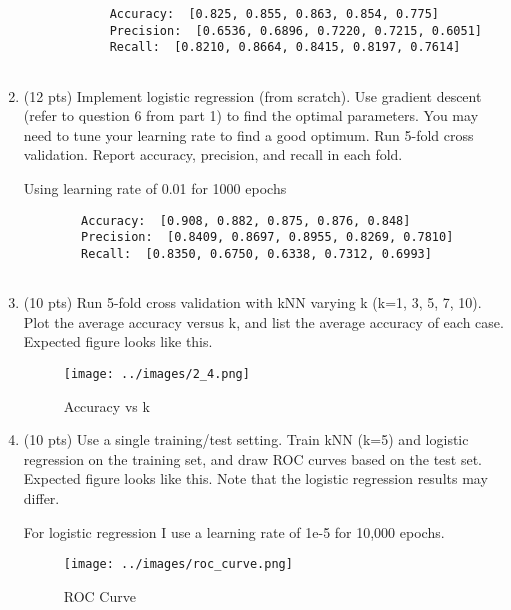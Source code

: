 \documentclass[a4paper]{article}
\theoremstyle{definition}
\newenvironment{soln}{
    \leavevmode\color{blue}\ignorespaces
}{}
\begin{document}
\begin{enumerate}
	\begin{soln}
		\begin{verbatim}
			Accuracy:  [0.825, 0.855, 0.863, 0.854, 0.775]
			Precision:  [0.6536, 0.6896, 0.7220, 0.7215, 0.6051]
			Recall:  [0.8210, 0.8664, 0.8415, 0.8197, 0.7614]
			
		\end{verbatim}
	\end{soln}
	
	\item (12 pts) Implement logistic regression (from scratch). Use gradient descent (refer to question 6 from part 1) to find the optimal parameters. You may need to tune your learning rate to find a good optimum. Run 5-fold cross validation. Report accuracy, precision, and recall in each fold.
	
	\begin{soln}
	Using learning rate of 0.01 for 1000 epochs
	\begin{verbatim}
		Accuracy:  [0.908, 0.882, 0.875, 0.876, 0.848]
		Precision:  [0.8409, 0.8697, 0.8955, 0.8269, 0.7810]
		Recall:  [0.8350, 0.6750, 0.6338, 0.7312, 0.6993]
		

	\end{verbatim}
	\end{soln}
	
	\item (10 pts) Run 5-fold cross validation with kNN varying k (k=1, 3, 5, 7, 10). Plot the average accuracy versus k, and list the average accuracy of each case. \\
	Expected figure looks like this.

	\begin{soln} 
		\begin{figure}[H]
			\centering
			\texttt{[image: ../images/2\_4.png]}
			\caption{Accuracy vs k}
			\label{fig:knn_4}
		\end{figure}
	\end{soln}
	
	\item (10 pts) Use a single training/test setting. Train kNN (k=5) and logistic regression on the training set, and draw ROC curves based on the test set. \\
	Expected figure looks like this.
	Note that the logistic regression results may differ.
	
	\begin{soln}  
	For logistic regression I use a learning rate of 1e-5 for 10,000 epochs.
	\begin{figure}[H]
		\centering
		\texttt{[image: ../images/roc\_curve.png]}
		\caption{ROC Curve}
		\label{fig:roc_5}
	\end{figure}
	\end{soln}
	
\end{enumerate}

\end{document}
